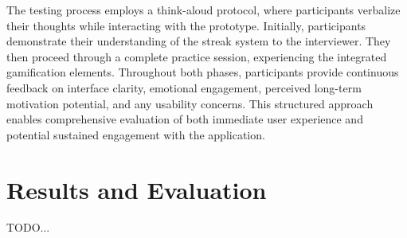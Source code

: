 The testing process employs a think-aloud protocol, where participants verbalize their thoughts while interacting with the prototype. Initially, participants demonstrate their understanding of the streak system to the interviewer. They then proceed through a complete practice session, experiencing the integrated gamification elements. Throughout both phases, participants provide continuous feedback on interface clarity, emotional engagement, perceived long-term motivation potential, and any usability concerns. This structured approach enables comprehensive evaluation of both immediate user experience and potential sustained engagement with the application.

\newpage

\section{Results and Evaluation}

TODO...